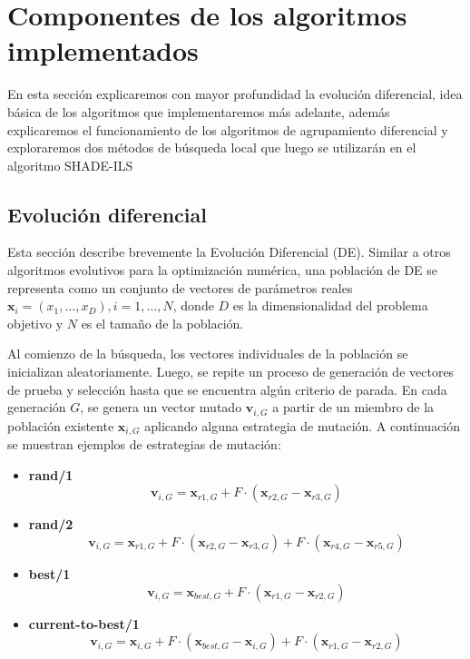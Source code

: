 
\chapter{Componentes de los algoritmos implementados}

En esta sección explicaremos con mayor profundidad la evolución diferencial, idea básica de los algoritmos que implementaremos más adelante, además explicaremos el funcionamiento de los algoritmos de agrupamiento diferencial y exploraremos dos métodos de búsqueda local que luego se utilizarán en el algoritmo SHADE-ILS

\section{Evolución diferencial}

Esta sección describe brevemente la Evolución Diferencial (DE). Similar a otros algoritmos evolutivos para la optimización numérica, una población de DE se representa como un conjunto de vectores de parámetros reales \( \mathbf{x}_i = (x_{1}, \ldots, x_{D}), i = 1, \ldots, N \), donde \( D \) es la dimensionalidad del problema objetivo y \( N \) es el tamaño de la población. 

Al comienzo de la búsqueda, los vectores individuales de la población se inicializan aleatoriamente. Luego, se repite un proceso de generación de vectores de prueba y selección hasta que se encuentra algún criterio de parada. En cada generación \( G \), se genera un vector mutado \( \mathbf{v}_{i,G} \) a partir de un miembro de la población existente \( \mathbf{x}_{i,G} \) aplicando alguna estrategia de mutación. A continuación se muestran ejemplos de estrategias de mutación:

\begin{itemize}
    \item \textbf{rand/1}
    \[
    \mathbf{v}_{i,G} = \mathbf{x}_{r1,G} + F \cdot (\mathbf{x}_{r2,G} - \mathbf{x}_{r3,G})
    \]

    \item \textbf{rand/2}
    \[
    \mathbf{v}_{i,G} = \mathbf{x}_{r1,G} + F \cdot (\mathbf{x}_{r2,G} - \mathbf{x}_{r3,G}) + F \cdot (\mathbf{x}_{r4,G} - \mathbf{x}_{r5,G})
    \]

    \item \textbf{best/1}
    \[
    \mathbf{v}_{i,G} = \mathbf{x}_{best,G} + F \cdot (\mathbf{x}_{r1,G} - \mathbf{x}_{r2,G})
    \]

    \item \textbf{current-to-best/1}
    \[
    \mathbf{v}_{i,G} = \mathbf{x}_{i,G} + F \cdot (\mathbf{x}_{best,G} - \mathbf{x}_{i,G}) + F \cdot (\mathbf{x}_{r1,G} - \mathbf{x}_{r2,G})
    \]
\end{itemize}

